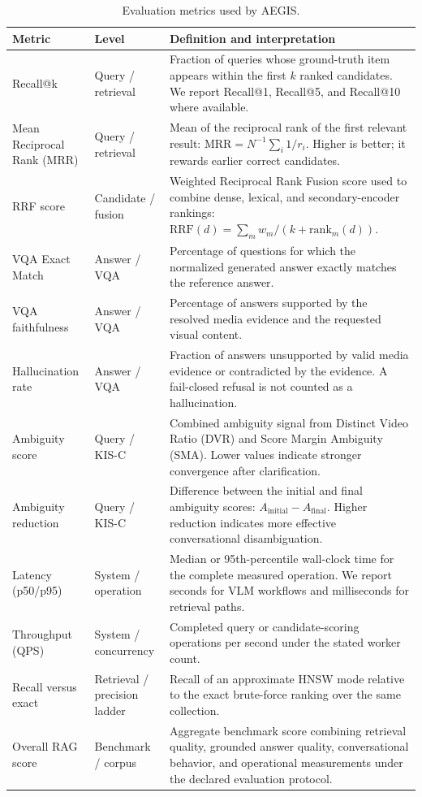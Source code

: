 \documentclass[a4paper,10pt]{article}
\begin{document}
\begin{table}[ht]
\centering
\small
\caption{Evaluation metrics used by AEGIS.}
\label{tab:metrics}
\begin{tabularx}{\textwidth}{>{\raggedright\arraybackslash}p{3.1cm} >{\raggedright\arraybackslash}p{2.6cm} X}
\toprule
\textbf{Metric} & \textbf{Level} & \textbf{Definition and interpretation} \\
\midrule
Recall@k & Query / retrieval & Fraction of queries whose ground-truth item appears within the first $k$ ranked candidates. We report Recall@1, Recall@5, and Recall@10 where available. \\
Mean Reciprocal Rank (MRR) & Query / retrieval & Mean of the reciprocal rank of the first relevant result: $\mathrm{MRR}=N^{-1}\sum_i 1/r_i$. Higher is better; it rewards earlier correct candidates. \\
RRF score & Candidate / fusion & Weighted Reciprocal Rank Fusion score used to combine dense, lexical, and secondary-encoder rankings: $\mathrm{RRF}(d)=\sum_m w_m/(k+\mathrm{rank}_m(d))$. \\
VQA Exact Match & Answer / VQA & Percentage of questions for which the normalized generated answer exactly matches the reference answer. \\
VQA faithfulness & Answer / VQA & Percentage of answers supported by the resolved media evidence and the requested visual content. \\
Hallucination rate & Answer / VQA & Fraction of answers unsupported by valid media evidence or contradicted by the evidence. A fail-closed refusal is not counted as a hallucination. \\
Ambiguity score & Query / KIS-C & Combined ambiguity signal from Distinct Video Ratio (DVR) and Score Margin Ambiguity (SMA). Lower values indicate stronger convergence after clarification. \\
Ambiguity reduction & Query / KIS-C & Difference between the initial and final ambiguity scores: $A_{\mathrm{initial}}-A_{\mathrm{final}}$. Higher reduction indicates more effective conversational disambiguation. \\
Latency (p50/p95) & System / operation & Median or 95th-percentile wall-clock time for the complete measured operation. We report seconds for VLM workflows and milliseconds for retrieval paths. \\
Throughput (QPS) & System / concurrency & Completed query or candidate-scoring operations per second under the stated worker count. \\
Recall versus exact & Retrieval / precision ladder & Recall of an approximate HNSW mode relative to the exact brute-force ranking over the same collection. \\
Overall RAG score & Benchmark / corpus & Aggregate benchmark score combining retrieval quality, grounded answer quality, conversational behavior, and operational measurements under the declared evaluation protocol. \\
\bottomrule
\end{tabularx}
\end{table}
\end{document}
